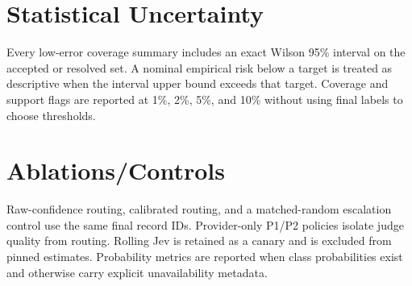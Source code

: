\documentclass[11pt]{article}
\begin{document}
\section{Statistical Uncertainty}
Every low-error coverage summary includes an exact Wilson 95\% interval on the accepted or resolved set. A nominal empirical risk below a target is treated as descriptive when the interval upper bound exceeds that target. Coverage and support flags are reported at 1\%, 2\%, 5\%, and 10\% without using final labels to choose thresholds.
\section{Ablations/Controls}
Raw-confidence routing, calibrated routing, and a matched-random escalation control use the same final record IDs. Provider-only P1/P2 policies isolate judge quality from routing. Rolling Jev is retained as a canary and is excluded from pinned estimates. Probability metrics are reported when class probabilities exist and otherwise carry explicit unavailability metadata.
\end{document}

